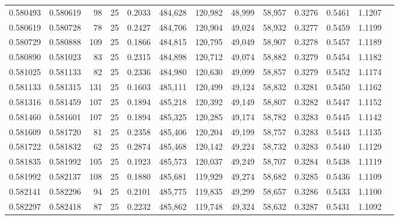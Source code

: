 \begin{tabular}{rrrrrrrrrrrrr}
0.580493 & 0.580619 &    98 &  25 &                                     0.2033 & 484,628 & 120,982 &  48,999 &  58,957 & 0.3276 & 0.5461 & 1.1207 \\
0.580619 & 0.580728 &    78 &  25 &                                     0.2427 & 484,706 & 120,904 &  49,024 &  58,932 & 0.3277 & 0.5459 & 1.1199 \\
0.580729 & 0.580888 &   109 &  25 &                                     0.1866 & 484,815 & 120,795 &  49,049 &  58,907 & 0.3278 & 0.5457 & 1.1189 \\
0.580890 & 0.581023 &    83 &  25 &                                     0.2315 & 484,898 & 120,712 &  49,074 &  58,882 & 0.3279 & 0.5454 & 1.1182 \\
0.581025 & 0.581133 &    82 &  25 &                                     0.2336 & 484,980 & 120,630 &  49,099 &  58,857 & 0.3279 & 0.5452 & 1.1174 \\
0.581133 & 0.581315 &   131 &  25 &                                     0.1603 & 485,111 & 120,499 &  49,124 &  58,832 & 0.3281 & 0.5450 & 1.1162 \\
0.581316 & 0.581459 &   107 &  25 &                                     0.1894 & 485,218 & 120,392 &  49,149 &  58,807 & 0.3282 & 0.5447 & 1.1152 \\
0.581460 & 0.581601 &   107 &  25 &                                     0.1894 & 485,325 & 120,285 &  49,174 &  58,782 & 0.3283 & 0.5445 & 1.1142 \\
0.581609 & 0.581720 &    81 &  25 &                                     0.2358 & 485,406 & 120,204 &  49,199 &  58,757 & 0.3283 & 0.5443 & 1.1135 \\
0.581722 & 0.581832 &    62 &  25 &                                     0.2874 & 485,468 & 120,142 &  49,224 &  58,732 & 0.3283 & 0.5440 & 1.1129 \\
0.581835 & 0.581992 &   105 &  25 &                                     0.1923 & 485,573 & 120,037 &  49,249 &  58,707 & 0.3284 & 0.5438 & 1.1119 \\
0.581992 & 0.582137 &   108 &  25 &                                     0.1880 & 485,681 & 119,929 &  49,274 &  58,682 & 0.3285 & 0.5436 & 1.1109 \\
0.582141 & 0.582296 &    94 &  25 &                                     0.2101 & 485,775 & 119,835 &  49,299 &  58,657 & 0.3286 & 0.5433 & 1.1100 \\
0.582297 & 0.582418 &    87 &  25 &                                     0.2232 & 485,862 & 119,748 &  49,324 &  58,632 & 0.3287 & 0.5431 & 1.1092 \\

\end{tabular}
